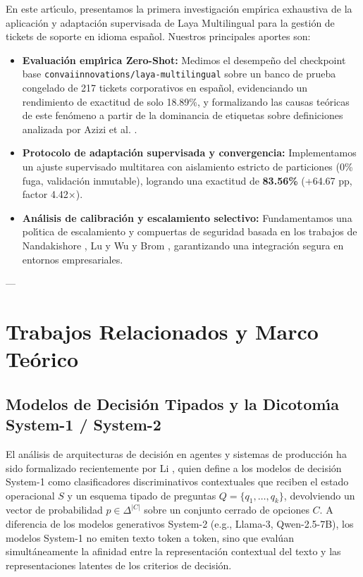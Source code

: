 \documentclass[10pt,journal,compsoc]{IEEEtran}
\begin{document}
En este art\'{\i}culo, presentamos la primera investigaci\'on emp\'{\i}rica exhaustiva de la aplicaci\'on y adaptaci\'on supervisada de Laya Multilingual para la gesti\'on de tickets de soporte en idioma espa\~nol. Nuestros principales aportes son:
\begin{itemize}
    \item \textbf{Evaluaci\'on emp\'{\i}rica Zero-Shot:} Medimos el desempe\~no del checkpoint base \texttt{convaiinnovations/laya-multilingual} sobre un banco de prueba congelado de 217 tickets corporativos en espa\~nol, evidenciando un rendimiento de exactitud de solo 18.89\%, y formalizando las causas te\'oricas de este fen\'omeno a partir de la dominancia de etiquetas sobre definiciones analizada por Azizi et al. \cite{azizi2026labels}.
    \item \textbf{Protocolo de adaptaci\'on supervisada y convergencia:} Implementamos un ajuste supervisado multitarea con aislamiento estricto de particiones (0\% fuga, validaci\'on inmutable), logrando una exactitud de \textbf{83.56\%} (+64.67 pp, factor 4.42$\times$).
    \item \textbf{An\'alisis de calibraci\'on y escalamiento selectivo:} Fundamentamos una pol\'{\i}tica de escalamiento y compuertas de seguridad basada en los trabajos de Nandakishore \cite{nandakishore2026laya}, Lu y Wu \cite{lu2026benchmarking} y Brom \cite{brom2026confidence}, garantizando una integraci\'on segura en entornos empresariales.
\end{itemize}

---

\section{Trabajos Relacionados y Marco Te\'orico}

\subsection{Modelos de Decisi\'on Tipados y la Dicotom\'{\i}a System-1 / System-2}
El an\'alisis de arquitecturas de decisi\'on en agentes y sistemas de producci\'on ha sido formalizado recientemente por Li \cite{li2026fast}, quien define a los modelos de decisi\'on System-1 como clasificadores discriminativos contextuales que reciben el estado operacional $S$ y un esquema tipado de preguntas $Q=\{q_1, \dots, q_k\}$, devolviendo un vector de probabilidad $p \in \Delta^{|C|}$ sobre un conjunto cerrado de opciones $C$. A diferencia de los modelos generativos System-2 (e.g., Llama-3, Qwen-2.5-7B), los modelos System-1 no emiten texto token a token, sino que eval\'uan simult\'aneamente la afinidad entre la representaci\'on contextual del texto y las representaciones latentes de los criterios de decisi\'on.
\end{document}
